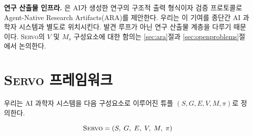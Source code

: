 \documentclass[11pt]{article}
\newcommand{\sgmvpi}{$(S, G, E, V, M, \pi)$}
\newcommand{\framework}{\textsc{Servo}}
\begin{document}
\textbf{연구 산출물 인프라.} \citet{liu2026lasthuman}은 AI가 생성한 연구의 구조적 출력 형식이자 검증 프로토콜로 Agent-Native Research Artifacts(ARA)를 제안한다. 우리는 이 기여를 종단간 AI 과학자 시스템과 별도로 위치시킨다. 발견 루프가 아닌 연구 산출물 계층을 다루기 때문이다. \framework{}의 $V$ 및 $M_s$ 구성요소에 대한 함의는 \ref{sec:ara}절과 \ref{sec:openproblems}절에서 논의한다.

\section{\framework{} 프레임워크}
\label{sec:framework}

우리는 AI 과학자 시스템을 다음 구성요소로 이루어진 튜플 \sgmvpi{}로 정의한다.

\begin{equation}
  \text{\framework{}} = (S,\; G,\; E,\; V,\; M,\; \pi)
\end{equation}
\end{document}
